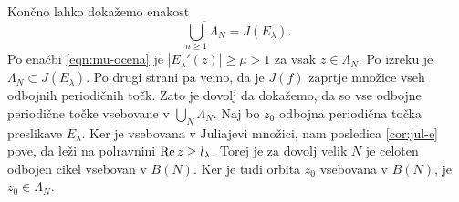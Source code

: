 \noindent Končno lahko dokažemo enakost
\[\overline{\bigcup_{n \geq 1} \Lambda_N} = J (E_\lambda).\]
Po enačbi \eqref{eqn:mu-ocena} je \(|E_\lambda' (z)| \geq \mu > 1\) za vsak \(z \in \Lambda_N\). Po izreku  je \(\Lambda_N \subset J (E_\lambda)\). Po drugi strani pa vemo, da je \(J (f)\) zaprtje množice vseh odbojnih periodičnih točk. Zato je dovolj da dokažemo, da so vse odbojne periodične točke vsebovane v \(\bigcup_N \Lambda_N\). Naj bo \(z_0\) odbojna periodična točka preslikave \(E_\lambda\). Ker je vsebovana v Juliajevi množici, nam posledica \ref{cor:jul-e} pove, da leži na polravnini \(\operatorname{Re} z \geq l_\lambda\). Torej je za dovolj velik \(N\) je celoten odbojen cikel vsebovan v \(B (N)\). Ker je tudi orbita \(z_0\) vsebovana v \(B (N)\), je \(z_0 \in \Lambda_N\).
